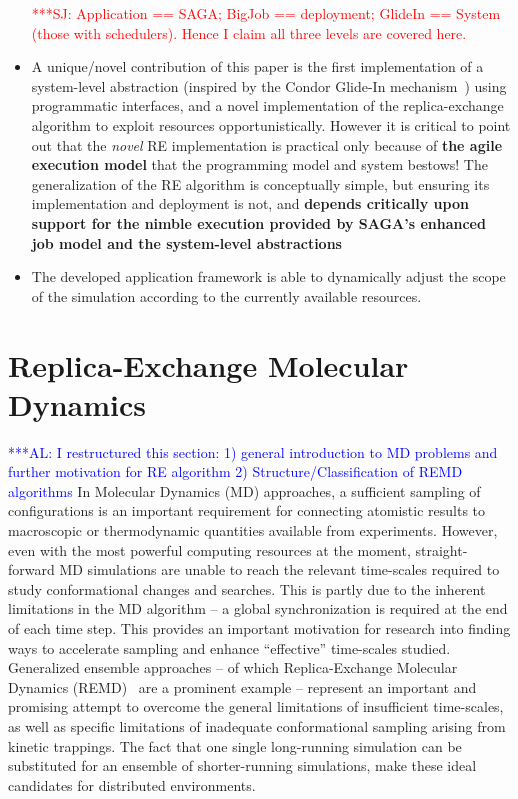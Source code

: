 \documentclass{rspublic}
\newcommand{\alnote}[1]{ {\textcolor{blue} { ***AL: #1 }}}
\newcommand{\jhanote}[1]{ {\textcolor{red} { ***SJ: #1 }}}
\newcommand{\alnote}[1]{}
\newcommand{\jhanote}[1]{}
\begin{document}
\begin{itemize}
   \jhanote{Application == SAGA; BigJob == deployment; GlideIn ==
      System (those with schedulers). Hence I claim all three levels
      are covered here.}

  \item A unique/novel contribution of this paper is the first
    implementation of a system-level abstraction (inspired by the Condor
    Glide-In mechanism~\citep{citeulike:291860}) using programmatic
    interfaces, and a novel implementation of the replica-exchange
    algorithm to exploit resources opportunistically.  However it is
    critical to point out that the {\it novel} RE implementation is
    practical only because of {\bf the agile execution model} that the
    programming model and system bestows! The generalization of the RE
    algorithm is conceptually simple, but ensuring its implementation
    and deployment is not, and {\bf depends critically upon support for
      the nimble execution provided by SAGA's enhanced job model and the
      system-level abstractions}

  \item The developed application framework is able to dynamically
    adjust the scope of the simulation according to the currently
    available resources.

\end{itemize}
\fi

\section{Replica-Exchange Molecular Dynamics}
\alnote{I restructured this section: 1) general introduction to MD
  problems and further motivation for RE algorithm 2)
  Structure/Classification of REMD algorithms}  In Molecular
Dynamics (MD) approaches, a sufficient sampling of configurations is
an important requirement for connecting atomistic results to
macroscopic or thermodynamic quantities available from experiments.
However, even with the most powerful computing resources at the
moment, straight-forward MD simulations are unable to reach the
relevant time-scales required to study conformational changes and
searches. This is partly due to the inherent limitations in the MD
algorithm -- a global synchronization is required at the end of each
time step.  This provides an important motivation for research into
finding ways to accelerate sampling and enhance ``effective''
time-scales studied. Generalized ensemble approaches -- of which
Replica-Exchange Molecular Dynamics (REMD)~\citep{Sugita:1999rm} are a
prominent example -- represent an important and promising attempt to
overcome the general limitations of insufficient time-scales, as well
as specific limitations of inadequate conformational sampling arising
from kinetic trappings.  The fact that one single long-running
simulation can be substituted for an ensemble of shorter-running
simulations, make these ideal candidates for distributed environments.
\end{document}
